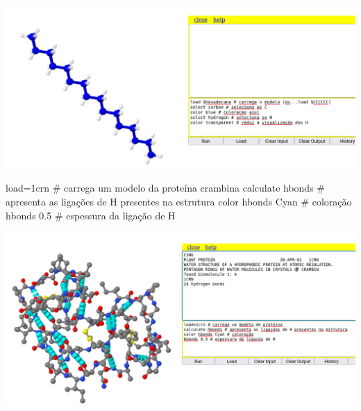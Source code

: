 \documentclass[
  letterpaper,
  DIV=11,
  numbers=noendperiod]{scrreprt}
\newenvironment{Shaded}{\begin{snugshade}}{\end{snugshade}}
\newcommand{\CommentTok}[1]{\textcolor[rgb]{0.37,0.37,0.37}{#1}}
\newcommand{\DecValTok}[1]{\textcolor[rgb]{0.68,0.00,0.00}{#1}}
\newcommand{\FloatTok}[1]{\textcolor[rgb]{0.68,0.00,0.00}{#1}}
\newcommand{\NormalTok}[1]{\textcolor[rgb]{0.00,0.23,0.31}{#1}}
\newcommand{\OtherTok}[1]{\textcolor[rgb]{0.00,0.23,0.31}{#1}}
\newcommand{\SpecialCharTok}[1]{\textcolor[rgb]{0.37,0.37,0.37}{#1}}
\begin{document}
\includegraphics{hexadecano.png}

\begin{Shaded}
\begin{Highlighting}[]
\NormalTok{load}\OtherTok{=}\DecValTok{1}\NormalTok{crn }\CommentTok{\# carrega um modelo da proteína crambina}
\NormalTok{calculate hbonds }\CommentTok{\# apresenta as ligações de H presentes na estrutura}
\NormalTok{color hbonds Cyan }\CommentTok{\# coloração}
\NormalTok{hbonds }\FloatTok{0.5} \CommentTok{\# espessura da ligação de H}
\end{Highlighting}
\end{Shaded}

\includegraphics{hbondsCRN.png}

\begin{Shaded}
\end{Shaded}
\end{document}

